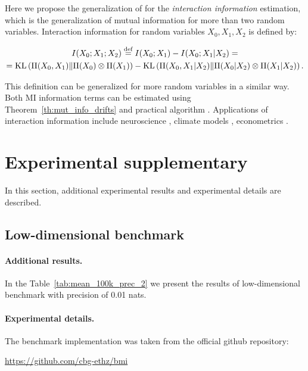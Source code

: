 Here we propose the generalization of \ourestname{} for the \textit{interaction information} estimation, which is the generalization of mutual information for more than two random variables. Interaction information for random variables $X_0, X_1, X_2$ is defined by:

\begin{gather}
    I(X_0;X_1; X_2) \stackrel{\text{def}}{=} I(X_0;X_1) - I(X_0;X_1|X_2) = \nonumber\\ = \mathrm{KL}\left(\Pi(X_0, X_1) \middle\Vert \Pi(X_0)\otimes \Pi(X_1)\right) - \mathrm{KL}\left(\Pi(X_0, X_1|X_2) \middle\Vert \Pi(X_0|X_2)\otimes \Pi(X_1|X_2)\right).
\end{gather}

This definition can be generalized for more random variables in a similar way. Both MI information terms can be estimated using Theorem~\ref{th:mut_info_drifts} and practical algorithm \ourestname{}. Applications of interaction information include neuroscience \cite{bounoua2024somegai_franceze_O_info}, climate models \cite{runge2019inferring}, econometrics \cite{dosi2019more}.


\section{Experimental supplementary}
\label{appendix:experimental_details}

In this section, additional experimental results and experimental details are described.

\subsection{Low-dimensional benchmark}

\paragraph{Additional results.} 

In the Table~\ref{tab:mean_100k_prec_2} we present the results of low-dimensional benchmark \cite{czyz2023beyond_normal} with precision of 0.01 nats.


\paragraph{Experimental details.}

The benchmark implementation was taken from the official github repository: 

\begin{center}
    \url{https://github.com/cbg-ethz/bmi}
\end{center}

